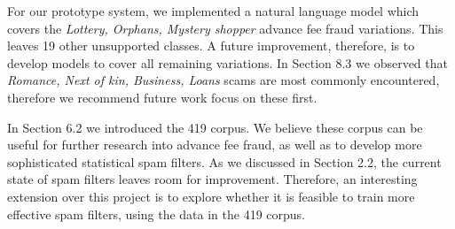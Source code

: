 For our prototype system, we implemented a natural language model which covers the \textit{Lottery, Orphans, Mystery shopper} advance fee fraud variations. This leaves 19 other unsupported classes. A future improvement, therefore, is to develop models to cover all remaining variations. In Section 8.3 we observed that \textit{Romance, Next of kin, Business, Loans} scams are most commonly encountered, therefore we recommend future work focus on these first.

In Section 6.2 we introduced the 419 corpus. We believe these corpus can be useful for further research into advance fee fraud, as well as to develop more sophisticated statistical spam filters. As we discussed in Section 2.2, the current state of spam filters leaves room for improvement. Therefore, an interesting extension over this project is to explore whether it is feasible to train more effective spam filters, using the data in the 419 corpus.
